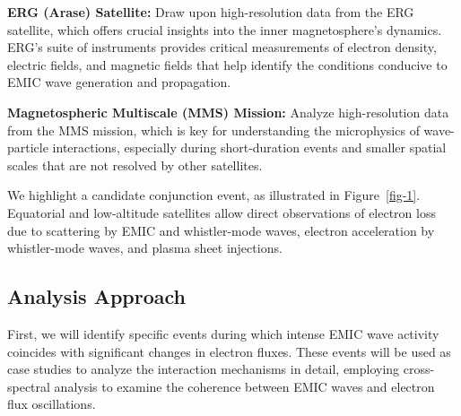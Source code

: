 \documentclass[
  letterpaper,
  DIV=11,
  numbers=noendperiod]{scrartcl}
\begin{document}
\textbf{ERG (Arase) Satellite:} Draw upon high-resolution data from the ERG satellite, which offers crucial insights into the inner magnetosphere's dynamics. ERG's suite of instruments provides critical measurements of electron density, electric fields, and magnetic fields that help identify the conditions conducive to EMIC wave generation and propagation.

\textbf{Magnetospheric Multiscale (MMS) Mission:} Analyze high-resolution data from the MMS mission, which is key for understanding the microphysics of wave-particle interactions, especially during short-duration events and smaller spatial scales that are not resolved by other satellites.

We highlight a candidate conjunction event, as illustrated in Figure~\ref{fig-1}. Equatorial and low-altitude satellites allow direct observations of electron loss due to scattering by EMIC and whistler-mode waves, electron acceleration by whistler-mode waves, and plasma sheet injections.

\subsection{Analysis Approach}\label{analysis-approach}

First, we will identify specific events during which intense EMIC wave activity coincides with significant changes in electron fluxes. These events will be used as case studies to analyze the interaction mechanisms in detail, employing cross-spectral analysis to examine the coherence between EMIC waves and electron flux oscillations.
\end{document}
